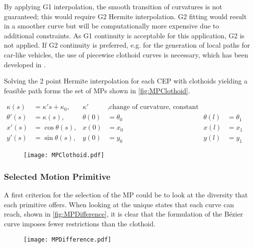 By applying G1 interpolation, the smooth transition of curvatures is not guaranteed; this would require G2 Hermite interpolation. G2 fitting would result in a smoother curve but will be computationally more expensive due to additional constraints. As G1 continuity is acceptable for this application, G2 is not applied. If G2 continuity is preferred, e.g. for the generation of local paths for car-like vehicles, the use of piecewise clothoid curves is necessary, which has been developed in \cite{McCraeSingh2009}.

Solving the 2 point Hermite interpolation for each CEP with clothoids yielding a feasible path forms the set of MPs shown in \cref{fig:MPClothoid}.

\begin{align}
\kappa(s)&=\kappa's + \kappa_0,	& \kappa' &, \text{change of curvature, constant} \label{eq:Cloth_kappa} \\ 
\theta'(s)&=\kappa(s),						& \theta(0)&=\theta_0	& \theta(l)&=\theta_1 \label{eq:Cloth_dtheta} & \\
x'(s)&=\cos\theta(s), 							& x(0)&=x_0 					& x(l)&=x_1 \label{eq:Cloth_dx} \\
y'(s)&=\sin\theta(s), 							& y(0)&=y_0 					& y(l)&=y_1 \label{eq:Cloth_dy} 
\end{align}

\begin{figure}[!htbp]
\centering
\texttt{[image: MPClothoid.pdf]}
\end{figure}

\subsubsection{Selected Motion Primitive}
A first criterion for the selection of the MP could be to look at the diversity that each primitive offers. When looking at the unique states that each curve can reach, shown in \cref{fig:MPDifference}, it is clear that the formulation of the Bézier curve imposes fewer restrictions than the clothoid.

\begin{figure}[!htbp]
	\centering
	\texttt{[image: MPDifference.pdf]}
\end{figure}

